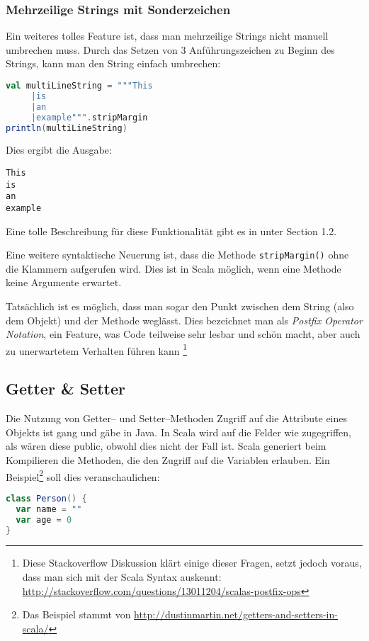 \subsubsection{Mehrzeilige Strings mit Sonderzeichen}
Ein weiteres tolles Feature ist, dass man mehrzeilige Strings nicht manuell umbrechen muss. Durch das Setzen von 3 Anführungszeichen zu Beginn des Strings, kann man den String einfach umbrechen:

\begin{lstlisting}[language=Scala]
val multiLineString = """This
     |is
     |an
     |example""".stripMargin
println(multiLineString)
\end{lstlisting}

Dies ergibt die Ausgabe:

\begin{verbatim}
This
is
an
example
\end{verbatim}

Eine tolle Beschreibung für diese Funktionalität gibt es in \cite{ScalaCookbook} unter Section 1.2.

Eine weitere syntaktische Neuerung ist, dass die Methode \texttt{stripMargin()} ohne die Klammern aufgerufen wird. Dies ist in Scala möglich, wenn eine Methode keine Argumente erwartet.

Tatsächlich ist es möglich, dass man sogar den Punkt zwischen dem String (also dem Objekt) und der Methode weglässt. Dies bezeichnet man als \textit{Postfix Operator Notation}, ein Feature, was Code teilweise sehr lesbar und schön macht, aber auch zu unerwartetem Verhalten führen kann \footnote{Diese Stackoverflow Diskussion klärt einige dieser Fragen, setzt jedoch voraus, dass man sich mit der Scala Syntax auskennt: \url{http://stackoverflow.com/questions/13011204/scalas-postfix-ops}}

\subsection{Getter \& Setter}\label{sec:getter-and-setter}
Die Nutzung von Getter-- und Setter--Methoden Zugriff auf die Attribute eines Objekts ist gang und gäbe in Java. In Scala wird auf die Felder wie zugegriffen, als wären diese public, obwohl dies nicht der Fall ist. Scala generiert beim Kompilieren die Methoden, die den Zugriff auf die Variablen erlauben. Ein Beispiel\footnote{Das Beispiel stammt von \url{http://dustinmartin.net/getters-and-setters-in-scala/}} soll dies veranschaulichen:

\begin{lstlisting}[language=Scala, caption=Beispiel Klasse Person]
class Person() {
  var name = ""
  var age = 0
}
\end{lstlisting}

